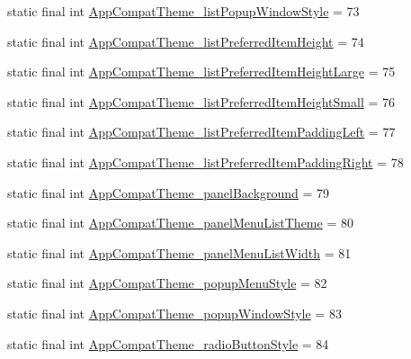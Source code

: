 \begin{DoxyCompactItemize}
\item 
static final int \mbox{\hyperlink{classcom_1_1synnapps_1_1carouselview_1_1_r_1_1styleable_acbe85e3230db03f8fd9902b2e7a7c00a}{App\+Compat\+Theme\+\_\+list\+Popup\+Window\+Style}} = 73
\item 
static final int \mbox{\hyperlink{classcom_1_1synnapps_1_1carouselview_1_1_r_1_1styleable_a3891dbf27f7a6f47145439a35797848c}{App\+Compat\+Theme\+\_\+list\+Preferred\+Item\+Height}} = 74
\item 
static final int \mbox{\hyperlink{classcom_1_1synnapps_1_1carouselview_1_1_r_1_1styleable_af9c6abf37b54531d963b189b0f86d47d}{App\+Compat\+Theme\+\_\+list\+Preferred\+Item\+Height\+Large}} = 75
\item 
static final int \mbox{\hyperlink{classcom_1_1synnapps_1_1carouselview_1_1_r_1_1styleable_aeb792e25618786fab86f385ddbaf02f0}{App\+Compat\+Theme\+\_\+list\+Preferred\+Item\+Height\+Small}} = 76
\item 
static final int \mbox{\hyperlink{classcom_1_1synnapps_1_1carouselview_1_1_r_1_1styleable_af79953d19d417b5b8d07e27bc720e6d9}{App\+Compat\+Theme\+\_\+list\+Preferred\+Item\+Padding\+Left}} = 77
\item 
static final int \mbox{\hyperlink{classcom_1_1synnapps_1_1carouselview_1_1_r_1_1styleable_a68b4a2bf317c83870e548df3471bdee5}{App\+Compat\+Theme\+\_\+list\+Preferred\+Item\+Padding\+Right}} = 78
\item 
static final int \mbox{\hyperlink{classcom_1_1synnapps_1_1carouselview_1_1_r_1_1styleable_ac8375739710d4a980d1dd705d6a1a755}{App\+Compat\+Theme\+\_\+panel\+Background}} = 79
\item 
static final int \mbox{\hyperlink{classcom_1_1synnapps_1_1carouselview_1_1_r_1_1styleable_a1c871522daed5a85bb1eb591f20f653b}{App\+Compat\+Theme\+\_\+panel\+Menu\+List\+Theme}} = 80
\item 
static final int \mbox{\hyperlink{classcom_1_1synnapps_1_1carouselview_1_1_r_1_1styleable_a1537c2402bab2beb343b22340f6c519d}{App\+Compat\+Theme\+\_\+panel\+Menu\+List\+Width}} = 81
\item 
static final int \mbox{\hyperlink{classcom_1_1synnapps_1_1carouselview_1_1_r_1_1styleable_a8fec50718c583c29a3c4c95f41f52fb7}{App\+Compat\+Theme\+\_\+popup\+Menu\+Style}} = 82
\item 
static final int \mbox{\hyperlink{classcom_1_1synnapps_1_1carouselview_1_1_r_1_1styleable_a5870813aae84c91f1ee359421b3eb75b}{App\+Compat\+Theme\+\_\+popup\+Window\+Style}} = 83
\item 
static final int \mbox{\hyperlink{classcom_1_1synnapps_1_1carouselview_1_1_r_1_1styleable_a3aaeec1341bcd1c9c678b76aa27bb40d}{App\+Compat\+Theme\+\_\+radio\+Button\+Style}} = 84

\end{DoxyCompactItemize}
